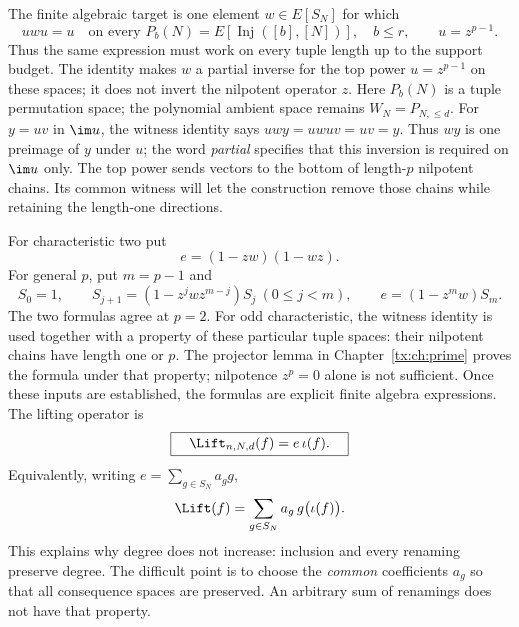 \documentclass[11pt,a4paper,oneside,openany]{book}
\theoremstyle{definition}\newtheorem{definition}[theorem]{Definition}
\theoremstyle{remark}\newtheorem{remark}[theorem]{Remark}
\DeclareMathOperator{\Inj}{Inj}
\numberwithin{equation}{chapter}
\begin{document}
The finite algebraic target is one element $w\in E[S_N]$ for which
\begin{equation}\label{tx:lift-eq:witness}
 u w u=u\quad\text{on every }P_b(N)=E[\Inj([b],[N])],\quad b\le r,
 \qquad u=z^{p-1}.
\end{equation}
Thus the same expression must work on every tuple length up to the
support budget. The identity makes $w$ a partial inverse for the
top power $u=z^{p-1}$ on these spaces; it does not invert the nilpotent
operator $z$. Here $P_b(N)$ is a tuple permutation space; the
polynomial ambient space remains $W_N=P_{N,\le d}$.
For $y=uv$ in $\im u$, the witness identity says $uwy=uwuv=uv=y$.
Thus $wy$ is one preimage of $y$ under $u$; the word \emph{partial}
specifies that this inversion is required on $\im u$ only.
The top power sends vectors to the bottom of length-$p$ nilpotent
chains. Its common witness will let the construction remove those
chains while retaining the length-one directions.

For characteristic two put
\[
                         e=(1-zw)(1-wz).
\]
For general $p$, put $m=p-1$ and
\begin{equation}\label{tx:eq:projector}
 S_0=1,\qquad S_{j+1}=(1-z^jwz^{m-j})S_j\ (0\le j<m),
 \qquad e=(1-z^mw)S_m.
\end{equation}
The two formulas agree at $p=2$. For odd characteristic, the witness
identity is used together with a property of these particular tuple
spaces: their nilpotent chains have length one or $p$. The projector
lemma in Chapter~\ref{tx:ch:prime} proves the formula under that
property; nilpotence $z^p=0$ alone is not sufficient. Once these inputs
are established, the formulas are explicit finite algebra expressions.
The lifting operator is
\begin{equation}\label{tx:lift-eq:actual-lift}
 \boxed{\quad\Lift_{n,N,d}(f)=e\,\iota(f).\quad}
\end{equation}
Equivalently, writing $e=\sum_{g\in S_N}a_g g$,
\[
                    \Lift(f)=\sum_{g\in S_N}a_g\,g\bigl(\iota(f)\bigr).
\]
This explains why degree does not increase: inclusion and every
renaming preserve degree. The difficult point is to choose the
\emph{common} coefficients $a_g$ so that all consequence spaces are
preserved. An arbitrary sum of renamings does not have that property.
\end{document}
